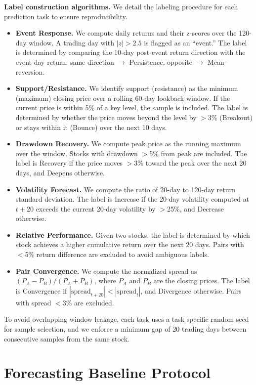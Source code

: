 \clearpage
\textbf{Label construction algorithms.}
We detail the labeling procedure for each prediction task to ensure reproducibility.
\begin{itemize}
\item \textbf{Event Response.} We compute daily returns and their z-scores over the 120-day window. A trading day with $|z| > 2.5$ is flagged as an ``event.'' The label is determined by comparing the 10-day post-event return direction with the event-day return: same direction $\rightarrow$ Persistence, opposite $\rightarrow$ Mean-reversion.
\item \textbf{Support/Resistance.} We identify support (resistance) as the minimum (maximum) closing price over a rolling 60-day lookback window. If the current price is within 5\% of a key level, the sample is included. The label is determined by whether the price moves beyond the level by $>$3\% (Breakout) or stays within it (Bounce) over the next 10 days.
\item \textbf{Drawdown Recovery.} We compute peak price as the running maximum over the window. Stocks with drawdown $>$5\% from peak are included. The label is Recovery if the price moves $>$3\% toward the peak over the next 20 days, and Deepens otherwise.
\item \textbf{Volatility Forecast.} We compute the ratio of 20-day to 120-day return standard deviation. The label is Increase if the 20-day volatility computed at $t{+}20$ exceeds the current 20-day volatility by $>$25\%, and Decrease otherwise.
\item \textbf{Relative Performance.} Given two stocks, the label is determined by which stock achieves a higher cumulative return over the next 20 days. Pairs with $<$5\% return difference are excluded to avoid ambiguous labels.
\item \textbf{Pair Convergence.} We compute the normalized spread as $(P_A - P_B) / (P_A + P_B)$, where $P_A$ and $P_B$ are the closing prices. The label is Convergence if $|\text{spread}_{t+20}| < |\text{spread}_t|$, and Divergence otherwise. Pairs with spread $<$3\% are excluded.
\end{itemize}
To avoid overlapping-window leakage, each task uses a task-specific random seed for sample selection, and we enforce a minimum gap of 20 trading days between consecutive samples from the same stock.

\clearpage
\section{Forecasting Baseline Protocol}
\label{app:forecast_protocol}

